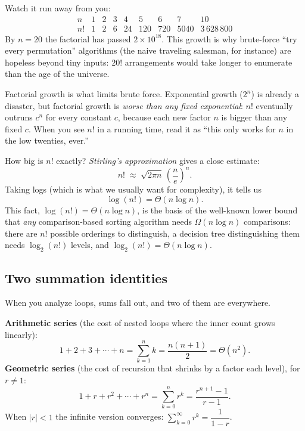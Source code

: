  Watch it run away from you:
\[
\begin{array}{c|cccccccc}
n   & 1 & 2 & 3 & 4 & 5   & 6   & 7    & 10 \\ \hline
n!  & 1 & 2 & 6 & 24 & 120 & 720 & 5040 & 3\,628\,800
\end{array}
\]
By $n = 20$ the factorial has passed $2 \times 10^{18}$. This growth is
why brute-force ``try every permutation'' algorithms (the naive
traveling salesman, for instance) are hopeless beyond tiny inputs: $20!$
arrangements would take longer to enumerate than the age of the universe.

\begin{intuitionbox}
Factorial growth is what limits brute force. Exponential growth
($2^n$) is already a disaster, but factorial growth is \emph{worse than any fixed
exponential}: $n!$ eventually outruns $c^n$ for every constant $c$, because each
new factor $n$ is bigger than any fixed $c$. When you see $n!$ in a running time,
read it as ``this only works for $n$ in the low twenties, ever.''
\end{intuitionbox}

How big is $n!$ exactly? \emph{Stirling's approximation} gives a close
estimate:
\[
n! \;\approx\; \sqrt{2\pi n}\,\left(\frac{n}{e}\right)^{n}.
\]
Taking logs (which is what we usually want for complexity), it tells us
\[
\log(n!) = \Theta(n \log n).
\]
This fact, $\log(n!) = \Theta(n\log n)$, is the basis of the well-known
lower bound that \emph{any} comparison-based sorting algorithm needs
$\Omega(n \log n)$ comparisons: there are $n!$ possible orderings to distinguish,
a decision tree distinguishing them needs $\log_2(n!)$ levels, and $\log_2(n!) =
\Theta(n \log n)$.

\subsection{Two summation identities}

When you analyze loops, sums fall out, and two of them are everywhere.

\begin{formalbox}
\textbf{Arithmetic series} (the cost of nested loops where the inner count grows
linearly):
\[
1 + 2 + 3 + \cdots + n = \sum_{k=1}^{n} k = \frac{n(n+1)}{2} = \Theta(n^2).
\]
\textbf{Geometric series} (the cost of recursion that shrinks by a factor each
level), for $r \ne 1$:
\[
1 + r + r^2 + \cdots + r^{n} = \sum_{k=0}^{n} r^k = \frac{r^{n+1} - 1}{r - 1}.
\]
When $\lvert r \rvert < 1$ the infinite version converges:
$\sum_{k=0}^{\infty} r^k = \dfrac{1}{1 - r}$.
\end{formalbox}

